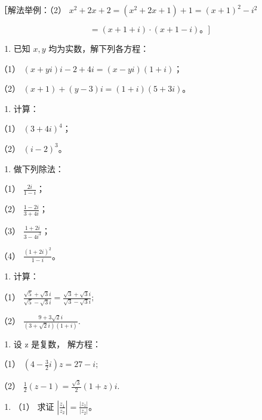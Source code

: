 ［解法举例：（2）
\(x^{2} + 2x + 2 = (x^{2} + 2x + 1) + 1 = (x + 1)^{2} - i^{2}\)

\[
= (x + 1 + i) \cdot (x + 1 - i)\text{。} ]
\]

\begin{enumerate}[start=4]
\item
  已知 \(x, y\) 均为实数，解下列各方程：
\end{enumerate}

（1） \((x + yi)i - 2 + 4i = (x - yi)(1 + i)\)；

（2） \((x + 1) + (y - 3)i = (1 + i)(5 + 3i)\)。

\begin{enumerate}[start=5]
\item
  计算：
\end{enumerate}

（1） \((3 + 4i)^{4}\)；

（2） \((i - 2)^{3}\)。

\begin{enumerate}[start=6]
\item
  做下列除法：
\end{enumerate}

（1） \(\frac{2i}{1 - i}\)；

（2） \(\frac{1 - 2i}{3 + 4i}\)；

（3） \(\frac{1 + 2i}{3 - 4i^3}\)；

（4） \(\frac{(1 + 2i)^2}{1 - i}\)。

\begin{enumerate}[start=7]
\item
  计算：
\end{enumerate}

（1）
\(\frac{\sqrt{5} + \sqrt{3}i}{\sqrt{5} - \sqrt{3}i} = \frac{\sqrt{3} + \sqrt{3}i}{\sqrt{3} - \sqrt{3}i};\)

（2） \(\frac{9 + 3\sqrt{2}i}{(3 + \sqrt{2}i)(1 + i)}.\)

\begin{enumerate}[start=8]
\item
  设 z 是复数， 解方程：
\end{enumerate}

（1） \(\left(4 - \frac{3}{2} i\right) z = 27 - i;\)

（2） \(\frac{1}{2} (z - 1) = \frac{\sqrt{3}}{2} (1 + z)i.\)

\begin{enumerate}[start=9]
\item
  （1） 求证 \(\left|\frac{z_1}{z_2}\right| = \frac{|z_1|}{|z_2|}\)。
\end{enumerate}

